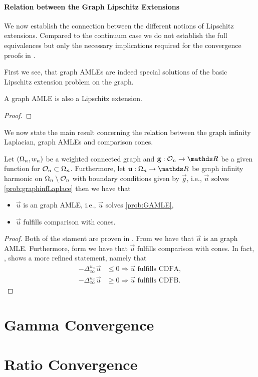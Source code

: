 \paragraph{Relation between the Graph Lipschitz Extensions}
We now establish the connection between the different notions of Lipschitz extensions. Compared to the continuum case we do not establish the full equivalences but only the necessary implications required for the convergence proofs in \cite{bungert2021uniform}.

First we see, that graph AMLEs are indeed special solutions of the basic Lipschitz extension problem on the graph.
%
\begin{lemma}{}{}
A graph AMLE is also a Lipschitz extension.
\end{lemma}
%
\begin{proof}

\end{proof}
%
%
We now state the main result concerning the relation between the graph infinity Laplacian, graph AMLEs and comparison cones.
%
%
\begin{lemma}{}{}
Let $(\Omega_n,w_n)$ be a weighted connected graph and $\vec g:\conset_n\to\R$ be a given function for $\mathcal{O}_n\subset\Omega_n$. Furthermore, let $\vec u:\domain_n\to\R$ be graph infinity harmonic on $\Omega_n\setminus\mathcal{O}_n$ with boundary conditions given by $\vec g$, i.e., $\vec u$ solves \cref{prob:graphinfLaplace} then we have that
%
\begin{itemize}
\item $\vec u$ is an graph AMLE, i.e., $\vec u$ solves \cref{prob:GAMLE},
\item $\vec u$ fulfills comparison with cones.
\end{itemize}
\end{lemma}
%
%
\begin{proof}
Both of the stament are proven in \cite{bungert2021uniform}. From \cite[Prop. 3.8]{bungert2021uniform} we have that $\vec u$ is an graph AMLE. Furthermore, form \cite[Th. 3.2]{bungert2021uniform} we have that $\vec u$ fulfills comparison with cones. In fact, \cite[Th. 3.2]{bungert2021uniform}, shows a more refined statement, namely that
%
\begin{align*}
-\Delta^{w_n}_\infty \vec u &\leq 0 \Rightarrow \vec u \text{ fulfills CDFA},\\
-\Delta^{w_n}_\infty \vec u &\geq 0 \Rightarrow \vec u \text{ fulfills CDFB}.
\end{align*}
%
\end{proof}


\section{Gamma Convergence}\label{sec:GConv}
%
\section{Ratio Convergence}\label{sec:RatConv}
%

